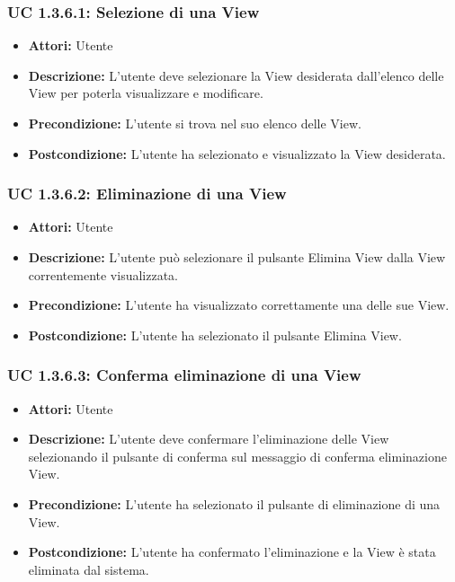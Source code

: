 \subsubsection{UC 1.3.6.1: Selezione di una View}

\begin{itemize}
    \item \textbf{Attori:} Utente
    \item \textbf{Descrizione:} L'utente deve selezionare la View desiderata dall'elenco delle View per poterla visualizzare e modificare.
    \item \textbf{Precondizione:} L'utente si trova nel suo elenco delle View.
    \item \textbf{Postcondizione:} L'utente ha selezionato e visualizzato la View desiderata.
\end{itemize}

\subsubsection{UC 1.3.6.2: Eliminazione di una View}

\begin{itemize}
    \item \textbf{Attori:} Utente
    \item \textbf{Descrizione:} L'utente può selezionare il pulsante Elimina View dalla View correntemente visualizzata.
    \item \textbf{Precondizione:} L'utente ha visualizzato correttamente una delle sue View.
    \item \textbf{Postcondizione:} L'utente ha selezionato il pulsante Elimina View.
\end{itemize}

\subsubsection{UC 1.3.6.3: Conferma eliminazione di una View}

\begin{itemize}
    \item \textbf{Attori:} Utente
    \item \textbf{Descrizione:} L'utente deve confermare l'eliminazione delle View selezionando il pulsante di conferma sul messaggio di conferma eliminazione View.
    \item \textbf{Precondizione:} L'utente ha selezionato il pulsante di eliminazione di una View.
    \item \textbf{Postcondizione:} L'utente ha confermato l'eliminazione e la View è stata eliminata dal sistema.
\end{itemize}




